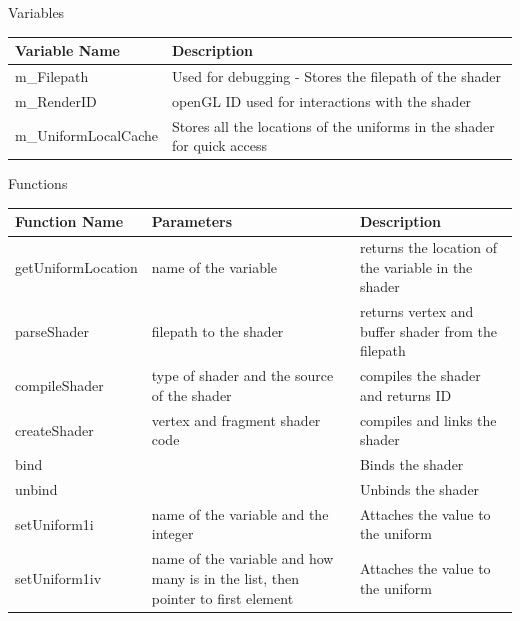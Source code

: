 \documentclass{article}
\begin{document}
                \begin{center}
                    Variables
                    \begin{tabular}{ | m{} | m{} | }
                        \hline
                        \textbf{Variable Name} & \textbf{Description} \\
                        \hline
                        m\_Filepath & Used for debugging - Stores the filepath of the shader \\
                        \hline
                        m\_RenderID & openGL ID used for interactions with the shader \\
                        \hline
                        m\_UniformLocalCache & Stores all the locations of the uniforms in the shader for quick access \\
                        \hline
                    \end{tabular}
                    Functions
                    \begin{tabular}{ | m{} | m{}| m{} | }
                        \hline
                        \textbf{Function Name} & \textbf{Parameters} & \textbf{Description} \\
                        \hline
                        getUniformLocation & name of the variable & returns the location of the variable in the shader \\
                        \hline
                        parseShader & filepath to the shader & returns vertex and buffer shader from the filepath \\
                        \hline
                        compileShader & type of shader and the source of the shader & compiles the shader and returns ID \\
                        \hline
                        createShader & vertex and fragment shader code & compiles and links the shader \\
                        \hline
                        bind & & Binds the shader \\
                        \hline
                        unbind & & Unbinds the shader \\
                        \hline
                        setUniform1i & name of the variable and the integer & Attaches the value to the uniform \\
                        \hline
                        setUniform1iv & name of the variable and how many is in the list, then pointer to first element & Attaches the value to the uniform \\

\end{tabular}
\end{center}
\end{document}
